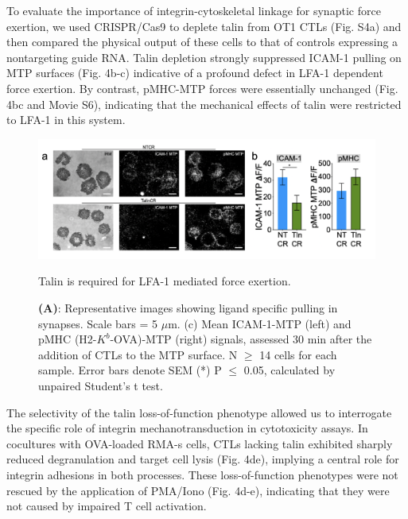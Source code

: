 To evaluate the importance of integrin-cytoskeletal linkage for synaptic force exertion, we used CRISPR/Cas9 to deplete talin from OT1 CTLs (Fig. S4a) and then compared the physical output of these cells to that of controls expressing a nontargeting guide RNA. Talin depletion strongly suppressed ICAM-1 pulling on MTP surfaces (Fig. 4b-c) indicative of a profound defect in LFA-1 dependent force exertion. By contrast, pMHC-MTP forces were essentially unchanged (Fig. 4bc and Movie S6), indicating that the mechanical effects of talin were restricted to LFA-1 in this system. 

\begin{figure}[htbp]
	\centering
	\includegraphics[width=1.0\columnwidth]{../figures/chapter3/fig4mtp.png}
	\caption{Talin is required for LFA-1 mediated force exertion.}
	\caption*{\textbf{(A)}: Representative images showing ligand specific pulling in synapses. Scale bars = 5 $\mu$m. (c) Mean ICAM-1-MTP (left) and pMHC (H2-$K^{b}$-OVA)-MTP (right) signals, assessed 30 min after the addition of CTLs to the MTP surface. N $\geq$ 14 cells for each sample.  Error bars denote SEM (*) P $\leq$ 0.05, calculated by unpaired Student’s t test.}
	\label{fig:fig4mtp}
\end{figure} 

The selectivity of the talin loss-of-function phenotype allowed us to interrogate the specific role of integrin mechanotransduction in cytotoxicity assays. In cocultures with OVA-loaded RMA-s cells, CTLs lacking talin exhibited sharply reduced degranulation and target cell lysis (Fig. 4de), implying a central role for integrin adhesions in both processes. These loss-of-function phenotypes were not rescued by the application of PMA/Iono (Fig. 4d-e), indicating that they were not caused by impaired T cell activation. 

